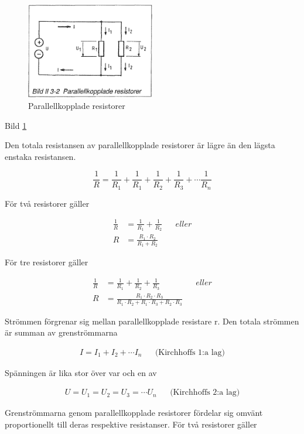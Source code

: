 \begin{figure}
\includegraphics[width=0.5\textwidth]{images/bild_2_3-02}
\caption{Parallellkopplade resistorer}
\label{fig:BildII3-02}
\end{figure}

Bild \ref{fig:BildII3-02}

Den totala resistansen av parallellkopplade resistorer är lägre än den lägsta
enstaka resistansen.

\[
\frac{1}{R} = \frac{1}{R_1} + \frac{1}{R_1} +
\frac{1}{R_2} + \frac{1}{R_3} + \cdots \frac{1}{R_n}
\]

För två resistorer gäller

\begin{align*}
\frac{1}{R} &= \frac{1}{R_1} + \frac{1}{R_2} && eller \\
R &= \frac{R_1 \cdot R_2}{R_1 + R_2}
\end{align*}

För tre resistorer gäller

\begin{align*}
\frac{1}{R} &= \frac{1}{R_1} + \frac{1}{R_2} + \frac{1}{R_3} && eller \\
R &= \frac{R_1\cdot R_2\cdot R_3}{R_1\cdot R_2 + R_1\cdot R_3 + R_2\cdot R_3}
\end{align*}

Strömmen förgrenar sig mellan parallellkopplade resistare r. Den totala strömmen
är summan av grenströmmarna

\begin{align*}
  I = I_1 + I_2 + \cdots I_n && \text{(Kirchhoffs 1:a lag)}
\end{align*}

Spänningen är lika stor över var och en av

\begin{align*}
  U = U_1 = U_2 = U_3 = \cdots U_n && \text{(Kirchhoffs 2:a lag)}
\end{align*}

Grenströmmarna genom parallellkopplade resistorer fördelar sig omvänt
proportionellt till deras respektive resistanser.
För två resistorer gäller

